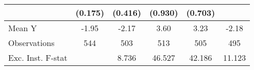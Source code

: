 {\begin{tabular}{l*{5}{c}}
            &     (0.175)         &     (0.416)         &     (0.930)         &     (0.703)         &                     \\
\midrule
Mean Y      &       -1.95         &       -2.17         &        3.60         &        3.23         &       -2.18         \\
Observations&         544         &         503         &         513         &         505         &         495         \\
Exc. Inst. F-stat&                     &       8.736         &      46.527         &      42.186         &      11.123         \\
\bottomrule
\end{tabular}
}
